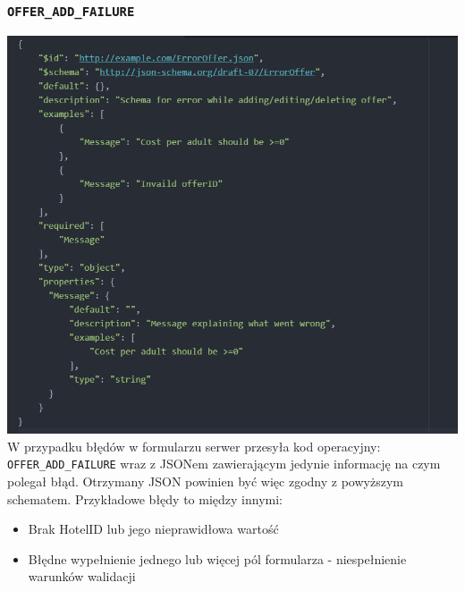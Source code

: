 \documentclass{article}
\begin{document}
\subsubsection{\texttt{OFFER\_ADD\_FAILURE}}
\includegraphics[width=\linewidth]{Oferta-Hotel-Serwer/Offer_Error.png}
W przypadku błędów w formularzu serwer przesyła kod operacyjny: \texttt{OFFER\_ADD\_FAILURE} wraz z JSONem zawierającym jedynie informację na czym polegał błąd. Otrzymany JSON powinien być więc zgodny z powyższym schematem.
Przykładowe błędy to między innymi:
\begin{itemize}
    \item Brak HotelID lub jego nieprawidłowa wartość
    \item Błędne wypełnienie jednego lub więcej pól formularza - niespełnienie warunków walidacji 
\end{itemize}
\end{document}
